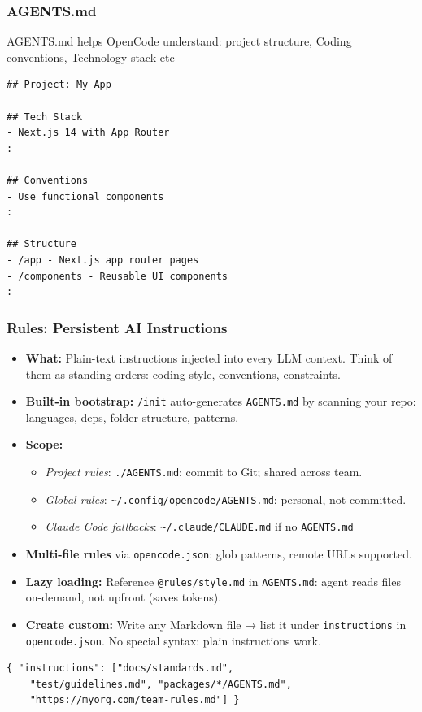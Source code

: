 \begin{frame}[fragile]\frametitle{AGENTS.md}
AGENTS.md helps OpenCode understand: project structure, Coding conventions, Technology stack etc

\begin{lstlisting}
## Project: My App

## Tech Stack
- Next.js 14 with App Router
:

## Conventions
- Use functional components
:

## Structure
- /app - Next.js app router pages
- /components - Reusable UI components
:
\end{lstlisting}
\end{frame}

\begin{frame}[fragile]\frametitle{Rules:  Persistent AI Instructions}
  \begin{itemize}
    \item \textbf{What:} Plain-text instructions injected into every LLM context. Think of them as standing orders:  coding style, conventions, constraints.
    \item \textbf{Built-in bootstrap:} \texttt{/init} auto-generates \texttt{AGENTS.md} by scanning your repo:  languages, deps, folder structure, patterns.
    \item \textbf{Scope:}
      \begin{itemize}
        \item \textit{Project rules}: \texttt{./AGENTS.md}:  commit to Git; shared across team.
        \item \textit{Global rules}: \texttt{\textasciitilde/.config/opencode/AGENTS.md}:  personal, not committed.
        \item \textit{Claude Code fallbacks}: \texttt{\textasciitilde/.claude/CLAUDE.md} if no \texttt{AGENTS.md} 
      \end{itemize}
    \item \textbf{Multi-file rules} via \texttt{opencode.json}: glob patterns, remote URLs supported.

    \item \textbf{Lazy loading:} Reference \texttt{@rules/style.md} in \texttt{AGENTS.md}:  agent reads files on-demand, not upfront (saves tokens).
    \item \textbf{Create custom:} Write any Markdown file → list it under \texttt{instructions} in \texttt{opencode.json}. No special syntax:  plain instructions work.
  \end{itemize}
  
\begin{lstlisting}
{ "instructions": ["docs/standards.md",
    "test/guidelines.md", "packages/*/AGENTS.md",
    "https://myorg.com/team-rules.md"] }
\end{lstlisting}  
\end{frame}

